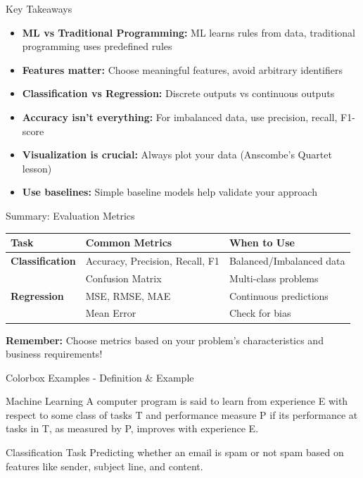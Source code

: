 \documentclass[usenames,dvipsnames]{beamer}
\begin{document}
\begin{frame}{Key Takeaways}
\begin{keypointsbox}
\begin{itemize}
	\item \textbf{ML vs Traditional Programming:} ML learns rules from data, traditional programming uses predefined rules
	\item \textbf{Features matter:} Choose meaningful features, avoid arbitrary identifiers
	\item \textbf{Classification vs Regression:} Discrete outputs vs continuous outputs
	\item \textbf{Accuracy isn't everything:} For imbalanced data, use precision, recall, F1-score
	\item \textbf{Visualization is crucial:} Always plot your data (Anscombe's Quartet lesson)
	\item \textbf{Use baselines:} Simple baseline models help validate your approach
\end{itemize}
\end{keypointsbox}
\end{frame}

\begin{frame}{Summary: Evaluation Metrics}
\begin{center}
\begin{tabular}{|l|l|l|}
\hline
\textbf{Task} & \textbf{Common Metrics} & \textbf{When to Use} \\
\hline
\textbf{Classification} & Accuracy, Precision, Recall, F1 & Balanced/Imbalanced data \\
 & Confusion Matrix & Multi-class problems \\
\hline
\textbf{Regression} & MSE, RMSE, MAE & Continuous predictions \\
 & Mean Error & Check for bias \\
\hline
\end{tabular}
\end{center}

\vspace{1cm}
\textbf{Remember:} Choose metrics based on your problem's characteristics and business requirements!
\end{frame}

\begin{frame}{Colorbox Examples - Definition \& Example}
\begin{definitionbox}{Machine Learning}
A computer program is said to learn from experience E with respect to some class of tasks T and performance measure P if its performance at tasks in T, as measured by P, improves with experience E.
\end{definitionbox}

\vspace{0.5cm}

\begin{examplebox}{Classification Task}
Predicting whether an email is spam or not spam based on features like sender, subject line, and content.
\end{examplebox}
\end{frame}
\end{document}
